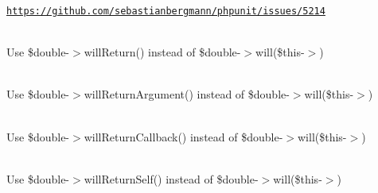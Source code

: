 \begin{DoxyRefList}
\label{deprecated__deprecated000319}%
%
\href{https://github.com/sebastianbergmann/phpunit/issues/5214}{\texttt{https\+://github.\+com/sebastianbergmann/phpunit/issues/5214}} 
\item[Global \doxylink{class_p_h_p_unit_1_1_framework_1_1_test_case_a5dbba3ebf8c740be8d3c9d811aa73fd5}{Test\+Case\+::on\+Consecutive\+Calls} (mixed ... \$arguments)]\hfill \\
\label{deprecated__deprecated000318}%
%
Use {\ttfamily \$double-\/\texorpdfstring{$>$}{>}will\+Return()} instead of {\ttfamily \$double-\/\texorpdfstring{$>$}{>}will(\$this-\/\texorpdfstring{$>$}{>})}  
\item[Global \doxylink{class_p_h_p_unit_1_1_framework_1_1_test_case_a2898e8fc5a7627f188fde3dc2c3c4db5}{Test\+Case\+::return\+Argument} (int \$argument\+Index)]\hfill \\
\label{deprecated__deprecated000315}%
%
Use {\ttfamily \$double-\/\texorpdfstring{$>$}{>}will\+Return\+Argument()} instead of {\ttfamily \$double-\/\texorpdfstring{$>$}{>}will(\$this-\/\texorpdfstring{$>$}{>})}  
\item[Global \doxylink{class_p_h_p_unit_1_1_framework_1_1_test_case_ac8562134b83b5a0f7cc0fcb50cfca1c3}{Test\+Case\+::return\+Callback} (callable \$callback)]\hfill \\
\label{deprecated__deprecated000316}%
%
Use {\ttfamily \$double-\/\texorpdfstring{$>$}{>}will\+Return\+Callback()} instead of {\ttfamily \$double-\/\texorpdfstring{$>$}{>}will(\$this-\/\texorpdfstring{$>$}{>})}  
\item[Global \doxylink{class_p_h_p_unit_1_1_framework_1_1_test_case_a90267a3fad433bb96e91c6b0c7d50a70}{Test\+Case\+::return\+Self} ()]\hfill \\
\label{deprecated__deprecated000317}%
%
Use {\ttfamily \$double-\/\texorpdfstring{$>$}{>}will\+Return\+Self()} instead of {\ttfamily \$double-\/\texorpdfstring{$>$}{>}will(\$this-\/\texorpdfstring{$>$}{>})}  

\end{DoxyRefList}
